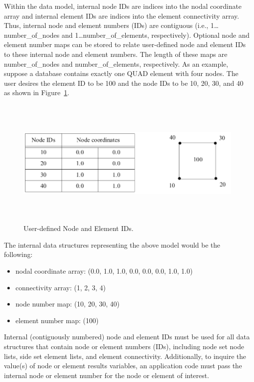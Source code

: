 Within the data model, internal node IDs are indices into
the nodal coordinate array and internal element IDs are indices
into the element connectivity array. Thus, internal node and
element numbers (IDs) are contiguous (i.e., 1\ldots{number_of_nodes}
and 1\ldots{number_of_elements}, respectively). Optional
node and element number maps can be stored to relate user-defined
node and element IDs to these internal node and element numbers.
The length of these maps are {number_of_nodes} and {number_of_elements},
respectively. As an example, suppose a database contains exactly
one QUAD element with four nodes. The user desires the element
ID to be 100 and the node IDs to be 10, 20, 30, and 40 as shown
in  Figure~\ref{f:UserDefinedNodeElementIds}.
\begin{figure}[htbp]
\begin{center}
\includegraphics[width=5.972in, height=2.486in]{figures/UserDefinedNodeElementIds.png}
\caption{User-defined Node and Element IDs.}\label{f:UserDefinedNodeElementIds}
\end{center}
\end{figure}

The internal data structures representing the above model
would be the following:


\begin{itemize}
 \item {nodal coordinate array}{:} {(0.0, 1.0, 1.0,
0.0, 0.0, 0.0, 1.0, 1.0)}

 \item {connectivity array}{: (1, 2, 3, 4)}

 \item {node number map}{: (10, 20, 30, 40)}

 \item {element number map}{: (100)}
\end{itemize}


Internal (contiguously numbered) node and element IDs must be used for
all data structures that contain node or element numbers (IDs),
including node set node lists, side set element lists, and element
connectivity. Additionally, to inquire the value(s) of node or element
results variables, an application code must pass the internal node or
element number for the node or element of interest.




